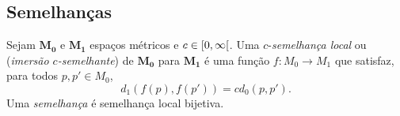 \subsection{Semelhanças}

\begin{definition}
Sejam $\bm{M_0}$ e $\bm{M_1}$ espaços métricos e $c \in \left[{0},{\infty}\right[$. Uma $c$-\emph{semelhança local} ou (\emph{imersão $c$-semelhante}) de $\bm{M_0}$ para $\bm{M_1}$ é uma função $f\colon M_0 \to M_1$ que satisfaz, para todos $p,p' \in M_0$,
	\begin{equation*}
	d_1(f(p),f(p')) = c d_0(p,p').
	\end{equation*}
Uma \emph{semelhança} é semelhança local bijetiva.
\end{definition}